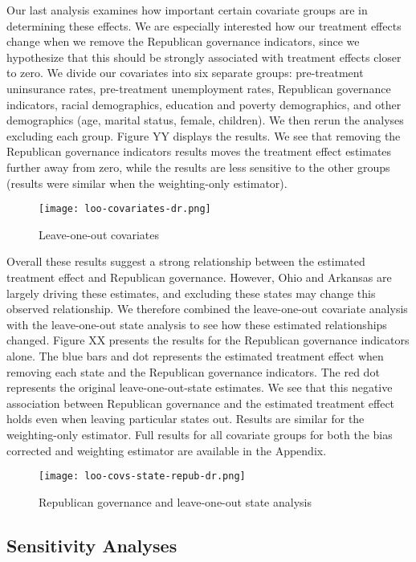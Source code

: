 \documentclass[final]{article}
\begin{document}
Our last analysis examines how important certain covariate groups are in determining these effects. We are especially interested how our treatment effects change when we remove the Republican governance indicators, since we hypothesize that this should be strongly associated with treatment effects closer to zero. We divide our covariates into six separate groups: pre-treatment uninsurance rates, pre-treatment unemployment rates, Republican governance indicators, racial demographics, education and poverty demographics, and other demographics (age, marital status, female, children). We then rerun the analyses excluding each group. Figure YY displays the results. We see that removing the Republican governance indicators results moves the treatment effect estimates further away from zero, while the results are less sensitive to the other groups (results were similar when the weighting-only estimator). 

\begin{figure}
    \texttt{[image: loo-covariates-dr.png]}
    \caption{Leave-one-out covariates}
\end{figure}

Overall these results suggest a strong relationship between the estimated treatment effect and Republican governance. However, Ohio and Arkansas are largely driving these estimates, and excluding these states may change this observed relationship. We therefore combined the leave-one-out covariate analysis with the leave-one-out state analysis to see how these estimated relationships changed. Figure XX presents the results for the Republican governance indicators alone. The blue bars and dot represents the estimated treatment effect when removing each state and the Republican governance indicators. The red dot represents the original leave-one-out-state estimates. We see that this negative association between Republican governance and the estimated treatment effect holds even when leaving particular states out. Results are similar for the weighting-only estimator. Full results for all covariate groups for both the bias corrected and weighting estimator are available in the Appendix.

\begin{figure}
    \texttt{[image: loo-covs-state-repub-dr.png]}
    \caption{Republican governance and leave-one-out state analysis}
\end{figure}

\subsection{Sensitivity Analyses}
\end{document}
